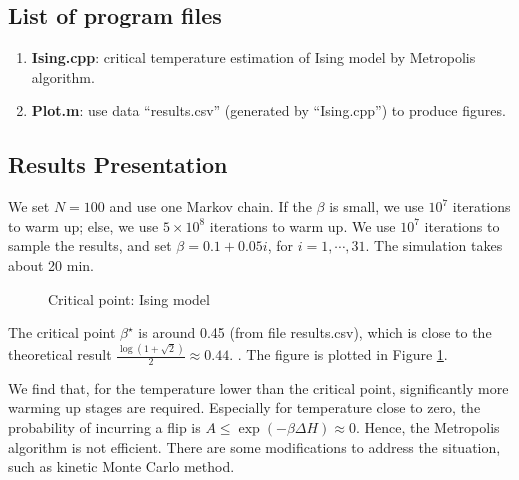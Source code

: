 \documentclass[conference,onecolumn,12pt]{IEEEtran}
\numberwithin{equation}{section}
\numberwithin{figure}{section}
\numberwithin{table}{section}
\theoremstyle{definition}
\begin{document}
\subsection{List of program files}
\begin{enumerate}
	\item {\bf Ising.cpp}: critical temperature estimation of Ising model by Metropolis algorithm.
	\item {\bf Plot.m}: use data ``results.csv'' (generated by ``Ising.cpp'') to produce figures.  
\end{enumerate}

\subsection{Results Presentation}
We set $N=100$ and use one Markov chain. If the $\beta$ is small, we use $10^7$ iterations to warm up; else, we use $5\times 10^8$ iterations to warm up. We use $10^7$ iterations to sample the results, and set $\beta=0.1+0.05 i$, for $i=1,\cdots,31$. The simulation takes about 20 min.\\
\begin{figure}[htbp]
	\centering
	\resizebox{\textwidth}{!}{
	}
	\caption{Critical point: Ising model}
	\label{1}
\end{figure}
The critical point $\beta^\star$ is around 0.45 (from file results.csv), which is close to the theoretical result $\frac{\log(1+\sqrt{2})}{2}\approx 0.44$. \cite{baxter2016exactly}. The figure is plotted in Figure \ref{1}.

We find that, for the temperature lower than the critical point, significantly more warming up stages are required. Especially for temperature close to zero,  the probability of incurring a flip is $A\leq \exp(-\beta \Delta H) \approx 0$. Hence, the Metropolis algorithm is not efficient. There are some modifications to address the situation, such as kinetic Monte Carlo method.



\end{document}
